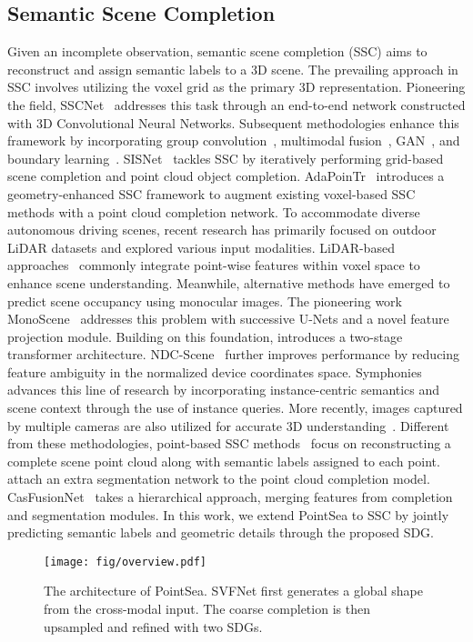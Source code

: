 \subsection{Semantic Scene Completion}
Given an incomplete observation, semantic scene completion (SSC) aims to reconstruct and assign semantic labels to a 3D scene.
The prevailing approach in SSC involves utilizing the voxel grid as the primary 3D representation. Pioneering the field, SSCNet~\citep{song2017semantic} addresses this task through an end-to-end network constructed with 3D Convolutional Neural Networks. Subsequent methodologies enhance this framework by incorporating group convolution~\citep{zhang2018efficient}, multimodal fusion~\citep{guo2018view}, GAN~\citep{wang2019forknet}, and boundary learning~\citep{chen20203d}. 
SISNet~\citep{cai2021semantic} tackles SSC by iteratively performing grid-based scene completion and point cloud object completion.
AdaPoinTr~\citep{10106495} introduces a geometry-enhanced SSC framework to augment existing voxel-based SSC methods with a point cloud completion network.
% 
To accommodate diverse autonomous driving scenes, recent research has primarily focused on outdoor LiDAR datasets and explored various input modalities.
LiDAR-based approaches~\citep{yan2021sparse,xia2023scpnet} commonly integrate point-wise features within voxel space to enhance scene understanding. Meanwhile, alternative methods have emerged to predict scene occupancy using monocular images. The pioneering work MonoScene~\citep{cao2022monoscene} addresses this problem with successive U-Nets and a novel feature projection module. Building on this foundation, \cite{li2023voxformer} introduces a two-stage transformer architecture. 
NDC-Scene~\citep{yao2023ndc} further improves performance by reducing feature ambiguity in the normalized device coordinates space. Symphonies~\citep{jiang2024symphonize} advances this line of research by incorporating instance-centric semantics and scene context through the use of instance queries.
More recently, images captured by multiple cameras are also utilized for accurate 3D understanding~\citep{Wei_2023_ICCV,huang2023tri}.
% 
Different from these methodologies, point-based SSC methods~\citep{zhang2021point,wang2022learning,xu2023casfusionnet,yan2023pointssc} focus on reconstructing a complete scene point cloud along with semantic labels assigned to each point.
\cite{wang2022learning} attach an extra segmentation network to the point cloud completion model.
CasFusionNet~\citep{xu2023casfusionnet} takes a hierarchical approach, merging features from completion and segmentation modules.
In this work, we extend PointSea to SSC by jointly predicting semantic labels and geometric details through the proposed SDG.

\begin{figure*}[h]
  \centering
  \texttt{[image: fig/overview.pdf]}
\caption{The architecture of PointSea. SVFNet first generates a global shape from the cross-modal input. The coarse completion is then upsampled and refined with two SDGs.}
  \label{fig:overview}
\end{figure*}
